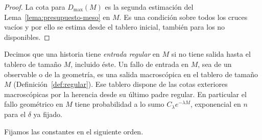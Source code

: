\begin{proof}
La cota para $D_{\max}(M)$ es la segunda estimación del Lema~\ref{lema:presupuesto-meso} en $M$.
Es una condición sobre todos los cruces vacíos y por ello se estima desde el tablero inicial, también
para los no disponibles.
\end{proof}
Decimos que una historia tiene \emph{entrada regular} en $M$ si no tiene salida hasta el tablero
de tamaño $M$, incluido éste. Un fallo de entrada en $M$, sea de un observable o de la geometría, es
una salida
macroscópica en el tablero de tamaño $M$ (Definición~\ref{def:regular}). Ese tablero dispone de las
cotas exteriores macroscópicas por la herencia desde su último padre regular. En particular el fallo
geométrico en $M$ tiene probabilidad a lo sumo $C_\lambda e^{-\lambda M}$, exponencial en $n$ para el
$\delta$ ya fijado.

Fijamos las constantes en el siguiente orden.
